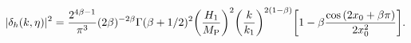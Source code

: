 \begin{equation}
|\delta_{h}(k, \eta)|^2 =  \frac{2^{4 \beta -1}}{ \pi^3  } ( 2 \beta )^{ - 2 \beta}
\Gamma(\beta + 1/2)^2 
\biggl(\frac{H_1}{M_{\rm P}}\biggr)^2   
\biggl(\frac{k}{k_1}\biggr)^{2(1 - \beta)} 
\biggl[ 1 - \beta \frac{\cos{(2 x_0 + \beta \pi)}}{2 x_0^2}\biggr].
\label{psus1}
\end{equation}

